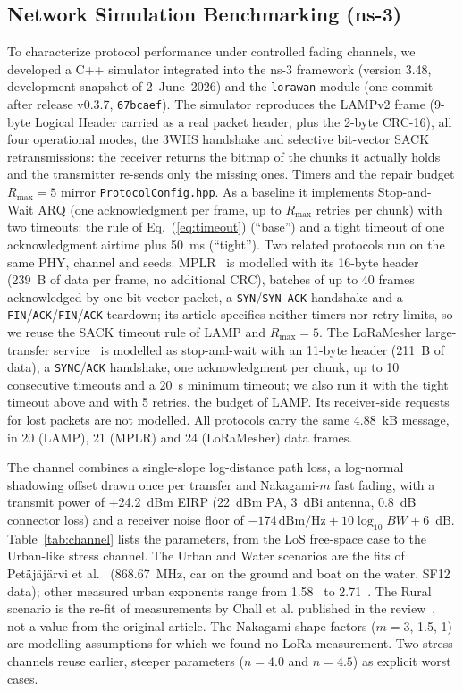 \documentclass[journal]{IEEEtran}
\begin{document}
\subsection{Network Simulation Benchmarking (ns-3)}
\label{sec:ns3_eval}
To characterize protocol performance under controlled fading channels, we developed a C++ simulator integrated into the ns-3 framework (version 3.48, development snapshot of 2~June~2026) and the \texttt{lorawan} module (one commit after release v0.3.7, \texttt{67bcaef}). The simulator reproduces the LAMPv2 frame (9-byte Logical Header carried as a real packet header, plus the 2-byte \ac{CRC}-16), all four operational modes, the \ac{3WHS} handshake and selective bit-vector \ac{SACK} retransmissions: the receiver returns the bitmap of the chunks it actually holds and the transmitter re-sends only the missing ones. Timers and the repair budget $R_{\mathrm{max}}=5$ mirror \texttt{ProtocolConfig.hpp}. As a baseline it implements Stop-and-Wait \ac{ARQ} (one acknowledgment per frame, up to $R_{\mathrm{max}}$ retries per chunk) with two timeouts: the rule of Eq.~(\ref{eq:timeout}) (``base'') and a tight timeout of one acknowledgment airtime plus 50~ms (``tight''). Two related protocols run on the same PHY, channel and seeds. MPLR~\cite{mplr-chen2019} is modelled with its 16-byte header (239~B of data per frame, no additional \ac{CRC}), batches of up to 40 frames acknowledged by one bit-vector packet, a \texttt{SYN}/\texttt{SYN-ACK} handshake and a \texttt{FIN}/\texttt{ACK}/\texttt{FIN}/\texttt{ACK} teardown; its article specifies neither timers nor retry limits, so we reuse the SACK timeout rule of \ac{LAMP} and $R_{\mathrm{max}}=5$. The LoRaMesher large-transfer service~\cite{sole2026largetransfer} is modelled as stop-and-wait with an 11-byte header (211~B of data), a \texttt{SYNC}/\texttt{ACK} handshake, one acknowledgment per chunk, up to 10 consecutive timeouts and a 20~s minimum timeout; we also run it with the tight timeout above and with 5 retries, the budget of \ac{LAMP}. Its receiver-side requests for lost packets are not modelled. All protocols carry the same 4.88~kB message, in 20 (\ac{LAMP}), 21 (MPLR) and 24 (LoRaMesher) data frames.

The channel combines a single-slope log-distance path loss, a log-normal shadowing offset drawn once per transfer and Nakagami-$m$ fast fading, with a transmit power of +24.2~dBm \ac{EIRP} (22~dBm PA, 3~dBi antenna, 0.8~dB connector loss) and a receiver noise floor of $-174\,\mathrm{dBm/Hz} + 10\log_{10}BW + 6$~dB. Table~\ref{tab:channel} lists the parameters, from the \ac{LoS} free-space case to the Urban-like stress channel. The Urban and Water scenarios are the fits of Petäjäjärvi et al.~\cite{petajajarvi2015} (868.67~MHz, car on the ground and boat on the water, SF12 data); other measured urban exponents range from 1.58~\cite{rademacher2021} to 2.71~\cite{dare-lorawan}. The Rural scenario is the re-fit of measurements by Chall et al. published in the review~\cite{azevedo2024}, not a value from the original article. The Nakagami shape factors ($m=3$, 1.5, 1) are modelling assumptions for which we found no LoRa measurement. Two stress channels reuse earlier, steeper parameters ($n=4.0$ and $n=4.5$) as explicit worst cases.
\end{document}
